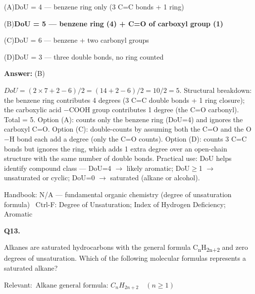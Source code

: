 \documentclass[11pt]{article}
\newcommand{\correct}[1]{\textbf{#1}\;{\color{accent}$\checkmark$}}
\newcommand{\optline}[2]{\par\noindent\hspace{1.2em}(#1)\hspace{0.6em}#2}
\begin{document}
\optline{A}{DoU = 4 --- benzene ring only (3 C=C bonds + 1 ring)}
\optline{B}{\correct{DoU = 5 --- benzene ring (4) + C=O of carboxyl group (1)}}
\optline{C}{DoU = 6 --- benzene + two carbonyl groups}
\optline{D}{DoU = 3 --- three double bonds, no ring counted}
\par\vspace{3pt}
\vspace{2pt}\par\noindent\colorbox{boxbg}{\parbox{\dimexpr\linewidth-2\fboxsep\relax}{%
\vspace{2pt}\textbf{Answer:} (B)\par\vspace{2pt}
{\small $DoU = (2\times7 + 2 - 6)/2 = (14+2-6)/2 = 10/2 = 5$. Structural breakdown: the benzene ring contributes 4 degrees (3 C=C double bonds + 1 ring closure); the carboxylic acid $-$COOH group contributes 1 degree (the C=O carbonyl). Total = 5. Option (A): counts only the benzene ring (DoU=4) and ignores the carboxyl C=O. Option (C): double-counts by assuming both the C=O and the O$-$H bond each add a degree (only the C=O counts). Option (D): counts 3 C=C bonds but ignores the ring, which adds 1 extra degree over an open-chain structure with the same number of double bonds. Practical use: DoU helps identify compound class --- DoU=4 $\rightarrow$ likely aromatic; DoU$\ge$1 $\rightarrow$ unsaturated or cyclic; DoU=0 $\rightarrow$ saturated (alkane or alcohol).}\par\vspace{2pt}
{\footnotesize\color{soft}Handbook: N/A --- fundamental organic chemistry (degree of unsaturation formula) \textbullet\ Ctrl-F: Degree of Unsaturation; Index of Hydrogen Deficiency; Aromatic}\vspace{2pt}
}}
\vspace{9pt}
\filbreak
\textbf{\color{accent}Q13.}\par\vspace{2pt}
Alkanes are saturated hydrocarbons with the general formula C\textsubscript{n}H\textsubscript{2}\textsubscript{n}\textsubscript{+}\textsubscript{2} and zero degrees of unsaturation. Which of the following molecular formulas represents a saturated alkane?\par\vspace{3pt}
{\small\color{soft}Relevant:}\ $\text{Alkane general formula: }C_nH_{2n+2}\quad (n\geq1)$\par\vspace{3pt}
\end{document}

